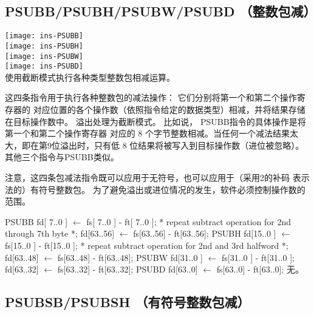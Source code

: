 \subsection{PSUBB/PSUBH/PSUBW/PSUBD （整数包减）}

\begin{instructionblk}
  \texttt{[image: ins-PSUBB]} \\
  \texttt{[image: ins-PSUBH]} \\
  \texttt{[image: ins-PSUBW]} \\
  \texttt{[image: ins-PSUBD]} \\
  {使用截断模式执行各种类型整数包相减运算。}
  {这四条指令用于执行各种整数包的减法操作： 它们分别将第一个和第二个操作寄存器的
  对应位置的各个操作数（依照指令给定的数据类型）相减，并将结果存储在目标操作数中。
  溢出处理为截断模式。 比如说， PSUBB指令的具体操作是将第一个和第二个操作寄存器
  对应的 8 个字节整数相减。当任何一个减法结果太大，即在第9位溢出时，只有低 8
  位结果将被写入到目标操作数（进位被忽略）。其他三个指令与PSUBB类似。
  
  注意，这四条包减法指令既可以应用于无符号，也可以应用于（采用2的补码
  表示法的）有符号整数包。 为了避免溢出或进位情况的发生，软件必须控制操作数的范围。}
  {PSUBB \narrownewline
  fd[ 7..0 ]  $\leftarrow$ fs[ 7..0 ] - ft[ 7..0 ]; \narrownewline
  * repeat subtract operation for 2nd through 7th byte *; \narrownewline
  fd[63..56] $\leftarrow$ fs[63..56] - ft[63..56]; \narrownewline \narrownewline
  PSUBH \narrownewline
  fd[15..0 ] $\leftarrow$ fs[15..0 ] - ft[15..0 ]; \narrownewline
  * repeat subtract operation for 2nd and 3rd halfword *; \narrownewline
  fd[63..48] $\leftarrow$ fs[63..48] - ft[63..48]; \narrownewline \narrownewline
  PSUBW \narrownewline
  fd[31..0 ] $\leftarrow$ fs[31..0 ] - ft[31..0 ]; \narrownewline
  fd[63..32] $\leftarrow$ fs[63..32] - ft[63..32]; \narrownewline \narrownewline
  PSUBD \narrownewline
  fd[63..0] $\leftarrow$ fs[63..0] - ft[63..0];}
  {无。}
\end{instructionblk}

\subsection{PSUBSB/PSUBSH （有符号整数包减）}

